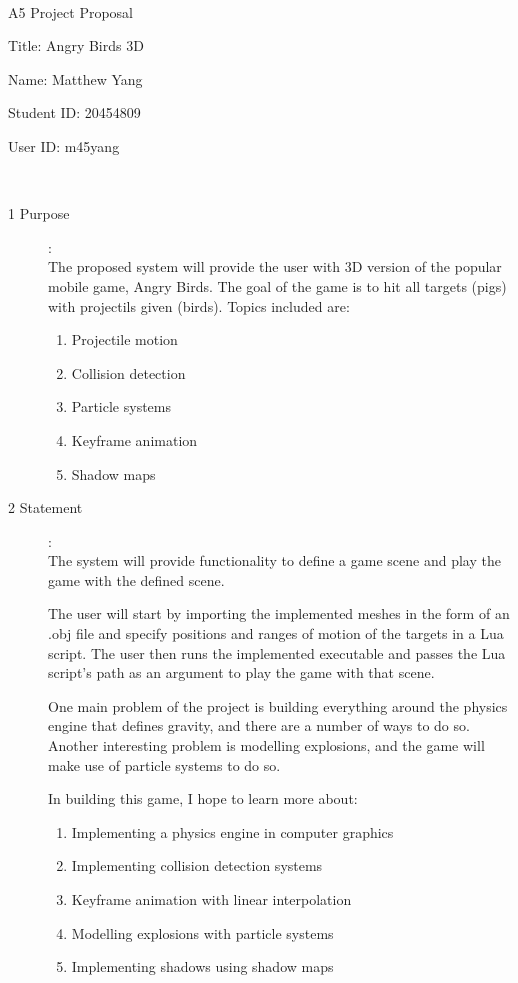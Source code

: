 \documentclass {article}
\begin{document}
~\vfill
\begin{center}
\Large

A5 Project Proposal

Title: Angry Birds 3D

Name: Matthew Yang

Student ID: 20454809

User ID: m45yang

\end{center}
\vfill ~\vfill~
\newpage
{}
\begin{description}
\item[1 Purpose]:\\
The proposed system will provide the user with 3D version of the popular mobile game, Angry Birds. The goal of the game is to hit all targets (pigs) with projectils given (birds). Topics included are: \medskip
\begin{enumerate}
\item
Projectile motion
\item
Collision detection
\item
Particle systems
\item
Keyframe animation
\item
Shadow maps
\end{enumerate}

\item[2 Statement]:\\
The system will provide functionality to define a game scene and play the game with the defined scene.

The user will start by importing the implemented meshes in the form of an .obj file and specify positions and ranges of motion of the targets in a Lua script. The user then runs the implemented executable and passes the Lua script's path as an argument to play the game with that scene. \medskip

One main problem of the project is building everything around the physics engine that defines gravity, and there are a number of ways to do so. Another interesting problem is modelling explosions, and the game will make use of particle systems to do so. \medskip

In building this game, I hope to learn more about:
\begin{enumerate}
\item
Implementing a physics engine in computer graphics
\item
Implementing collision detection systems
\item
Keyframe animation with linear interpolation
\item
Modelling explosions with particle systems
\item
Implementing shadows using shadow maps


\end{enumerate}
\end{description}
\end{document}
